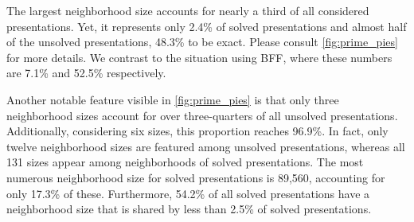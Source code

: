 The largest neighborhood size accounts for nearly a third of all considered presentations.
Yet, it represents only 2.4\% of solved presentations and almost half of the unsolved presentations, 48.3\% to be exact.
Please consult \cref{fig:prime_pies} for more details.
We contrast to the situation using BFF, where these numbers are 7.1\% and 52.5\% respectively.

Another notable feature visible in \cref{fig:prime_pies} is that only three neighborhood sizes account for over three-quarters of all unsolved presentations.
Additionally, considering six sizes, this proportion reaches 96.9\%.
In fact, only twelve neighborhood sizes are featured among unsolved presentations, whereas all 131 sizes appear among neighborhoods of solved presentations.
The most numerous neighborhood size for solved presentations is 89,560, accounting for only 17.3\% of these.
Furthermore, 54.2\% of all solved presentations have a neighborhood size that is shared by less than 2.5\% of solved presentations.

